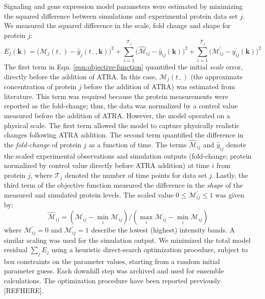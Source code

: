 \documentclass[12pt]{article}
\begin{document}
Signaling and gene expression model parameters were estimated by minimizing the squared difference between simulations and experimental protein data set $j$.
We measured the squared difference in the scale, fold change and shape for protein $j$:
\begin{equation}\label{eqn:objective-function}
	E_{j}(\mathbf{k}) = \biggl(\mathcal{M}_{j}\left(t_{-}\right)-\hat{y}_{j}\left(t_{-},\mathbf{k}\right)\biggr)^2+\sum_{i=1}^{\mathcal{T}_{j}}\biggl(\hat{\mathcal{M}}_{ij}-\hat{y}_{ij}(\mathbf{k})\biggr)^2 + \sum_{i=1}^{\mathcal{T}_{j}}\biggl(\mathcal{M}^{\prime}_{ij}-y^{\prime}_{ij}(\mathbf{k})\biggr)^2
\end{equation}
The first term in Eqn. \eqref{eqn:objective-function} quantified the initial \textit{scale} error, directly before the addition of ATRA.
In this case, $\mathcal{M}_{j}\left(t_{-}\right)$ (the approximate concentration of protein $j$ before the addition of ATRA) was estimated from literature.
This term was required because the protein measurements were reported as the fold-change; thus, the data was normalized by a control
value measured before the addition of ATRA. However, the model operated on a physical scale.
The first term allowed the model to capture physically realistic changes following ATRA addition.
The second term quantified the difference in the \textit{fold-change} of protein $j$ as a function of time.
The terms $\hat{\mathcal{M}}_{ij}$ and $\hat{y}_{ij}$ denote the scaled experimental observations and simulation outputs (fold-change; protein normalized by control value directly before ATRA addition)
at time $i$ from protein $j$,
where $\mathcal{T}_{j}$ denoted the number of time points for data set $j$.
Lastly, the third term of the objective function measured the difference in the \textit{shape} of the measured and simulated protein levels.
The scaled value $0\leq\mathcal{M}^{\prime}_{ij}\leq{1}$ was given by:
\begin{equation}\label{norm_exp_data}
\hat{\mathcal{M}}_{ij} = \left({\mathcal{M}_{ij} - \min_{i}\mathcal{M}_{ij}}\right)/\left({\max_{i}{\mathcal{M}_{ij}}-\min_{i}{\mathcal{M}_{ij}}}\right)
\end{equation}
where $\mathcal{M}^{\prime}_{ij}=0$ and $\mathcal{M}^{\prime}_{ij}=1$  describe the lowest (highest) intensity bands.
A similar scaling was used for the simulation output.
We minimized the total model residual $\sum_{j}E_{j}$ using a heuristic direct-search optimization procedure, subject to box constraints on the parameter values,
starting from a random initial parameter guess. Each downhill step was archived and used for ensemble calculations.
The optimization procedure have been reported previously [REFHERE].
\end{document}

